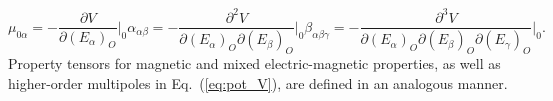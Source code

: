 \begin{subequations} \label{eq:derivs}
    \begin{equation} \label{eq:mu_0}
    \mu_{0\alpha} = -\frac{\partial V}{\partial (E_\alpha)_O}\Bigr|_0
    \end{equation}

    \begin{equation} \label{eq:alpha}
    \alpha_{\alpha\beta} = -\frac{\partial^2 V}{\partial (E_\alpha)_O \partial (E_\beta)_O}\Bigr|_0
    \end{equation}

    \begin{equation} \label{eq:beta}
    \beta_{\alpha\beta\gamma} = -\frac{\partial^3 V}{\partial (E_\alpha)_O \partial (E_\beta)_O \partial (E_\gamma)_O}\Bigr|_0.
    \end{equation}
\end{subequations}
Property tensors for magnetic and mixed electric-magnetic properties, as well as higher-order
multipoles in Eq.~(\ref{eq:pot_V}), are defined in an 
analogous manner.\cite{Barron2004} 

